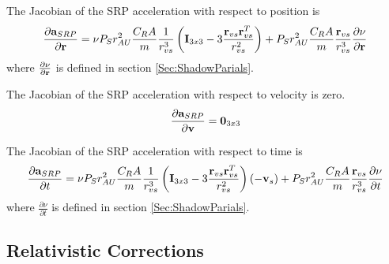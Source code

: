 The Jacobian of the SRP acceleration with respect to position is
%
\begin{equation}
    \frac{\partial \mathbf{a}_{SRP}}{\partial \mathbf{r}} = \nu P_{S}\displaystyle r_{AU}^2 \frac{   C_R A    }{m}\frac{1}{r_{vs}^3}\left( \mathbf{I}_{3x3}  -3 \frac{\mathbf{r}_{vs}\mathbf{r}_{vs}^T}{r_{vs}^2}\right) + P_{S}\displaystyle r_{AU}^2 \frac{   C_R A    }{m}\frac{\mathbf{r}_{vs}}{r_{vs}^3} \frac{\partial \nu}{\partial \mathbf{r}}
\end{equation}
%
where $\frac{\partial \nu}{\partial \mathbf{r}}$ is defined in section \ref{Sec:ShadowParials}.

The Jacobian of the SRP acceleration with respect to velocity is zero.
%
\begin{equation}
    \frac{\partial \mathbf{a}_{SRP}}{\partial \mathbf{v}} = \mathbf{0}_{3x3}
\end{equation}

The Jacobian of the SRP acceleration with respect to time is
%
\begin{equation}
    \frac{\partial \mathbf{a}_{SRP}}{\partial t} = \nu P_{S}\displaystyle r_{AU}^2 \frac{   C_R A    }{m}\frac{1}{r_{vs}^3}\left( \mathbf{I}_{3x3}  -3 \frac{\mathbf{r}_{vs}\mathbf{r}_{vs}^T}{r_{vs}^2}\right) (-\mathbf{v}_s) + P_{S}\displaystyle r_{AU}^2 \frac{   C_R A    }{m}\frac{\mathbf{r}_{vs}}{r_{vs}^3} \frac{\partial \nu}{\partial t}
\end{equation}
where $\frac{\partial \nu}{\partial t}$ is defined in section \ref{Sec:ShadowParials}.


\subsection{Relativistic Corrections}

